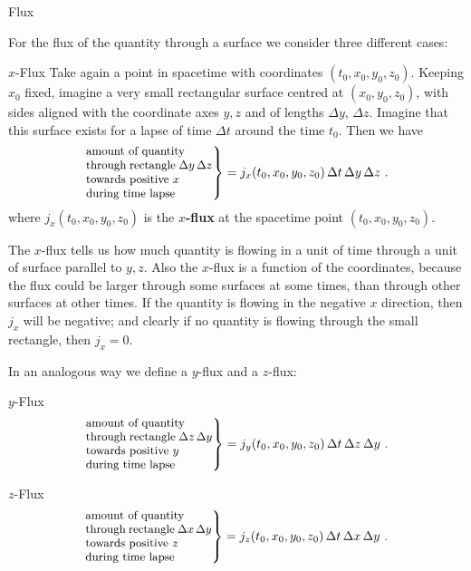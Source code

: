 \documentclass[a4paper,12pt,%
onecolumn,oneside,titlepage,%
british%
]{memoir}
\newcommand*{\incr}{\Delta}%
\renewcommand*{\|}[1][]{\nonscript\:#1\vert\nonscript\:\mathopen{}}
\newcommand*{\yti}{t_{0}}
\newcommand*{\yxi}{x_{0}}
\newcommand*{\yyi}{y_{0}}
\newcommand*{\yzi}{z_{0}}
\newcommand*{\Dt}{\incr t}
\newcommand*{\Dx}{\incr x}
\newcommand*{\Dy}{\incr y}
\newcommand*{\Dz}{\incr z}
\begin{document}
\medskip


\begin{warning}
  Flux
\end{warning}

For the flux of the quantity through a surface we consider three different cases:
\begin{definition}{$x$-Flux}
  Take again a point in spacetime with coordinates $(\yti,\yxi,\yyi,\yzi)$. Keeping $\yxi$ fixed, imagine a very small rectangular surface centred at $(\yxi,\yyi,\yzi)$, with sides aligned with the coordinate axes $y,z$ and of lengths $\Dy$, $\Dz$. Imagine that this surface exists for a lapse of time $\Dt$ around the time $\yti$. Then we have
  \begin{equation}
    \label{neq:xflux_expl}
    \left.\parbox[c]{10em}{\small amount of quantity\\ through rectangle $\Dy\,\Dz$\\ towards positive $x$\\during time lapse }\right\} = 
    j_{x}(\yti,\yxi,\yyi,\yzi)\, \Dt\, \Dy\, \Dz \ .
  \end{equation}
  where $j_{x}(\yti,\yxi,\yyi,\yzi)$ is the \textbf{$x$-flux} at the spacetime point $(\yti,\yxi,\yyi,\yzi)$.
\end{definition}
The $x$-flux tells us how much quantity is flowing in a unit of time through a unit of surface parallel to $y,z$. Also the $x$-flux is a function of the coordinates, because the flux could be larger through some surfaces at some times, than through other surfaces at other times. If the quantity is flowing in the negative $x$ direction, then $j_{x}$ will be negative; and clearly if no quantity is flowing through the small rectangle, then $j_{x}=0$.

In an analogous way we define a $y$-flux and a $z$-flux:

\begin{definition}{$y$-Flux}
  \begin{equation}
    \label{neq:yflux_expl}
    \left.\parbox[c]{10em}{\small amount of quantity\\ through rectangle $\Dz\,\Dy$\\ towards positive $y$\\during time lapse }\right\} = 
    j_{y}(\yti,\yxi,\yyi,\yzi)\, \Dt\, \Dz\, \Dy \ .
  \end{equation}
\end{definition}
\begin{definition}{$z$-Flux}
  \begin{equation}
    \label{neq:zflux_expl}
    \left.\parbox[c]{10em}{\small amount of quantity\\ through rectangle $\Dx\,\Dy$\\ towards positive $z$\\during time lapse }\right\} = 
    j_{z}(\yti,\yxi,\yyi,\yzi)\, \Dt\, \Dx\, \Dy \ .
  \end{equation}
\end{definition}
\end{document}
